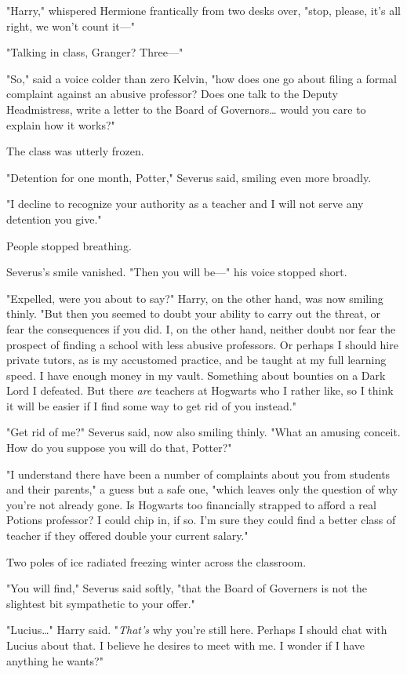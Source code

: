"Harry," whispered Hermione frantically from two desks over, "stop, please, 
it's all right, we won't count it---"

"Talking in class, Granger? Three---"

"So," said a voice colder than zero Kelvin, "how does one go about filing a 
formal complaint against an abusive professor? Does one talk to the Deputy 
Headmistress, write a letter to the Board of Governors{\ldots} would you care 
to explain how it works?"

The class was utterly frozen.

"Detention for one month, Potter," Severus said, smiling even more broadly.

"I decline to recognize your authority as a teacher and I will not serve any 
detention you give."

People stopped breathing.

Severus's smile vanished. "Then you will be---" his voice stopped short.

"Expelled, were you about to say?" Harry, on the other hand, was now smiling 
thinly. "But then you seemed to doubt your ability to carry out the threat, or 
fear the consequences if you did. I, on the other hand, neither doubt nor fear 
the prospect of finding a school with less abusive professors. Or perhaps I 
should hire private tutors, as is my accustomed practice, and be taught at my 
full learning speed. I have enough money in my vault. Something about bounties 
on a Dark Lord I defeated. But there \emph{are} teachers at Hogwarts who I 
rather like, so I think it will be easier if I find some way to get rid of you 
instead."

"Get rid of me?" Severus said, now also smiling thinly. "What an amusing 
conceit. How do you suppose you will do that, Potter?"

"I understand there have been a number of complaints about you from students 
and their parents," a guess but a safe one, "which leaves only the question of 
why you're not already gone. Is Hogwarts too financially strapped to afford a 
real Potions professor? I could chip in, if so. I'm sure they could find a 
better class of teacher if they offered double your current salary."

Two poles of ice radiated freezing winter across the classroom.

"You will find," Severus said softly, "that the Board of Governers is not the 
slightest bit sympathetic to your offer."

"Lucius{\ldots}" Harry said. "\emph{That's} why you're still here. Perhaps I 
should chat with Lucius about that. I believe he desires to meet with me. I 
wonder if I have anything he wants?"

